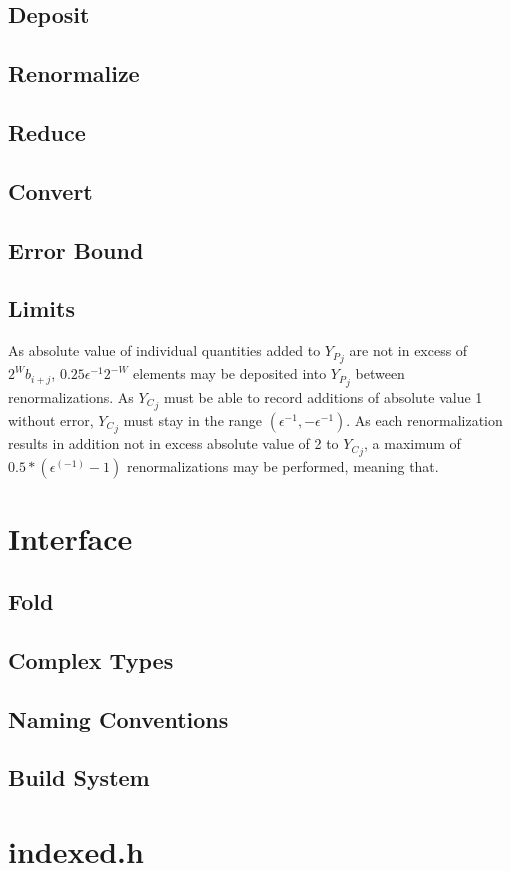 \documentclass[12pt]{article}
\theoremstyle{plain}
\begin{document}
  \subsection{Deposit}
  \subsection{Renormalize}
  \subsection{Reduce}
  \subsection{Convert}
  \subsection{Error Bound}
  \subsection{Limits}
    \label{sec:limits}
    As absolute value of individual quantities added to ${Y_P}_j$ are not in excess of $2^W b_{i + j}$, $0.25\epsilon^{-1}2^{-W}$ elements may be deposited into ${Y_P}_j$ between renormalizations. As ${Y_C}_j$ must be able to record additions of absolute value 1 without error, ${Y_C}_j$ must stay in the range $(\epsilon^{-1}, -\epsilon^{-1})$. As each renormalization results in addition not in excess absolute value of 2 to ${Y_C}_j$, a maximum of $0.5 * (\epsilon^(-1) - 1)$ renormalizations may be performed, meaning that.
\section{Interface}
  \subsection{Fold}
  \subsection{Complex Types}
  \subsection{Naming Conventions}
  \subsection{Build System}
\section{indexed.h}
\end{document}
